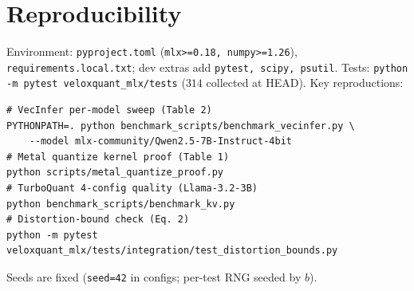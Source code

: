 \documentclass[11pt]{article}
\begin{document}


\appendix
\section{Reproducibility}
Environment: \texttt{pyproject.toml} (\texttt{mlx>=0.18, numpy>=1.26}),
\texttt{requirements.local.txt}; dev extras add \texttt{pytest, scipy, psutil}.
Tests: \texttt{python -m pytest veloxquant\_mlx/tests} ($314$ collected at
HEAD). Key reproductions:
\begin{verbatim}
# VecInfer per-model sweep (Table 2)
PYTHONPATH=. python benchmark_scripts/benchmark_vecinfer.py \
    --model mlx-community/Qwen2.5-7B-Instruct-4bit
# Metal quantize kernel proof (Table 1)
python scripts/metal_quantize_proof.py
# TurboQuant 4-config quality (Llama-3.2-3B)
python benchmark_scripts/benchmark_kv.py
# Distortion-bound check (Eq. 2)
python -m pytest veloxquant_mlx/tests/integration/test_distortion_bounds.py
\end{verbatim}
Seeds are fixed (\texttt{seed=42} in configs; per-test RNG seeded by $b$).
\end{document}
